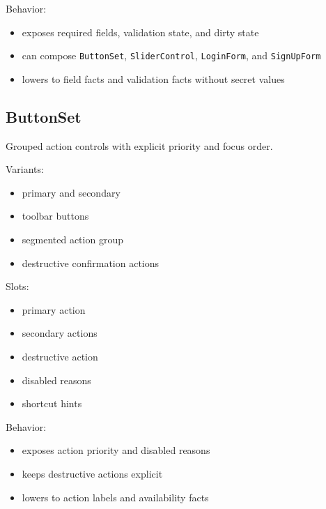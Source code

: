 Behavior:

\begin{itemize}
\tightlist
\item
  exposes required fields, validation state, and dirty state
\item
  can compose \texttt{B\allowbreak{}u\allowbreak{}t\allowbreak{}t\allowbreak{}o\allowbreak{}n\allowbreak{}S\allowbreak{}e\allowbreak{}t}, \texttt{S\allowbreak{}l\allowbreak{}i\allowbreak{}d\allowbreak{}e\allowbreak{}r\allowbreak{}C\allowbreak{}o\allowbreak{}n\allowbreak{}t\allowbreak{}r\allowbreak{}o\allowbreak{}l}, \texttt{L\allowbreak{}o\allowbreak{}g\allowbreak{}i\allowbreak{}n\allowbreak{}F\allowbreak{}o\allowbreak{}r\allowbreak{}m}, and \texttt{S\allowbreak{}i\allowbreak{}g\allowbreak{}n\allowbreak{}U\allowbreak{}p\allowbreak{}F\allowbreak{}o\allowbreak{}r\allowbreak{}m}
\item
  lowers to field facts and validation facts without secret values
\end{itemize}

\subsection{ButtonSet}\label{record-128-buttonset}

Grouped action controls with explicit priority and focus order.

Variants:

\begin{itemize}
\tightlist
\item
  primary and secondary
\item
  toolbar buttons
\item
  segmented action group
\item
  destructive confirmation actions
\end{itemize}

Slots:

\begin{itemize}
\tightlist
\item
  primary action
\item
  secondary actions
\item
  destructive action
\item
  disabled reasons
\item
  shortcut hints
\end{itemize}

Behavior:

\begin{itemize}
\tightlist
\item
  exposes action priority and disabled reasons
\item
  keeps destructive actions explicit
\item
  lowers to action labels and availability facts
\end{itemize}

